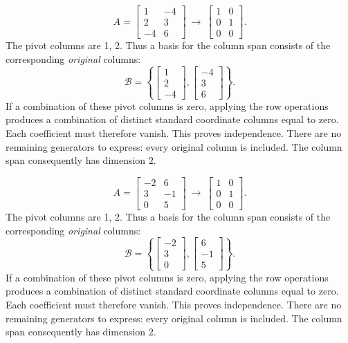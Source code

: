 \[A=\left[\begin{array}{rr}1&-4\\2&3\\-4&6\end{array}\right]\ \longrightarrow\ \left[\begin{array}{rr}1&0\\0&1\\0&0\end{array}\right].\]
The pivot columns are 1, 2. Thus a basis for the column span consists of the corresponding \emph{original} columns:
\[\mathcal B=\left\{\left[\begin{array}{r}1\\2\\-4\end{array}\right],\left[\begin{array}{r}-4\\3\\6\end{array}\right]\right\}.\]
If a combination of these pivot columns is zero, applying the row operations produces a combination of distinct standard coordinate columns equal to zero. Each coefficient must therefore vanish. This proves independence. There are no remaining generators to express: every original column is included. The column span consequently has dimension $2$.

\[A=\left[\begin{array}{rr}-2&6\\3&-1\\0&5\end{array}\right]\ \longrightarrow\ \left[\begin{array}{rr}1&0\\0&1\\0&0\end{array}\right].\]
The pivot columns are 1, 2. Thus a basis for the column span consists of the corresponding \emph{original} columns:
\[\mathcal B=\left\{\left[\begin{array}{r}-2\\3\\0\end{array}\right],\left[\begin{array}{r}6\\-1\\5\end{array}\right]\right\}.\]
If a combination of these pivot columns is zero, applying the row operations produces a combination of distinct standard coordinate columns equal to zero. Each coefficient must therefore vanish. This proves independence. There are no remaining generators to express: every original column is included. The column span consequently has dimension $2$.

